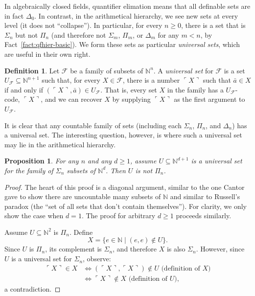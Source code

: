 \documentclass{article}
\theoremstyle{plain}
\newtheorem{prop}[thm]{Proposition}
\theoremstyle{definition}
\newtheorem{defn}[thm]{Definition}
\newcommand{\defterm}{\emph}
\newcommand{\tuple}{\bar}
\newcommand{\lgnum}{\ulcorner}
\newcommand{\rgnum}{\urcorner}
\begin{document}
In algebraically closed fields, quantifier elimation means that all
definable sets are in fact $\Delta_0$. In contrast, in the
arithmetical hierarchy, we see new sets at every level (it does not
``collapse''). In particular, for every $n \geq 0$, there is a set
that is $\Sigma_n$ but not $\Pi_n$ (and therefore not $\Sigma_m$,
$\Pi_m$, or $\Delta_m$ for any $m < n$, by
Fact~\ref{fact:qfhier-basic}). We form these sets as particular
\defterm{universal sets}, which are useful in their own right.

\begin{defn}
  Let $\mathcal{F}$ be a family of subsets of $\mathbb{N}^n$. A
  \defterm{universal set} for $\mathcal{F}$ is a set $U_\mathcal{F}
  \subseteq \mathbb{N}^{n+1}$ such that, for every $X \in
  \mathcal{F}$, there is a number $\lgnum X \rgnum$ such that
  $\tuple{a} \in X$ if and only if $(\lgnum X \rgnum, \tuple{a}) \in
  U_\mathcal{F}$. That is, every set $X$ in the family has a
  $U_\mathcal{F}$-code, $\lgnum X \rgnum$, and we can recover $X$ by
  supplying $\lgnum X \rgnum$ as the first argument to
  $U_\mathcal{F}$.
\end{defn}

It is clear that any countable family of sets (including each
$\Sigma_n$, $\Pi_n$, and $\Delta_n$) has a universal set. The
interesting question, however, is where such a universal set may lie
in the arithmetical hierarchy.

\begin{prop}\label{prop:univ-sign-not-pin}
  For any $n$ and any $d \geq 1$, assume $U \subseteq
  \mathbb{N}^{d+1}$ is a universal set for the family of $\Sigma_n$
  subsets of $\mathbb{N}^d$. Then $U$ is not $\Pi_n$.
\end{prop}
\begin{proof}
  The heart of this proof is a diagonal argument, similar to the one
  Cantor gave to show there are uncountable many subsets of
  $\mathbb{N}$ and similar to Russell's paradox (the ``set of all sets
  that don't contain themselves''). For clarity, we only show the case
  when $d = 1$. The proof for arbitrary $d \geq 1$ proceeds similarly.

  Assume $U \subseteq \mathbb{N}^2$ is $\Pi_n$. Define $$X = \{e \in
  \mathbb{N} \mid (e,e) \not\in U\}\text{.}$$ Since $U$ is $\Pi_n$,
  its complement is $\Sigma_n$, and therefore $X$ is also
  $\Sigma_n$. However, since $U$ is a universal set for $\Sigma_n$,
  observe:
  \begin{align*}
    \lgnum X \rgnum \in X
    &\iff (\lgnum X \rgnum, \lgnum X \rgnum) \not\in U \text{ (definition of } X \text{)} \\
    &\iff \lgnum X \rgnum \not\in X \text{ (definition of } U \text{),}
  \end{align*}
  a contradiction.
\end{proof}
\end{document}
